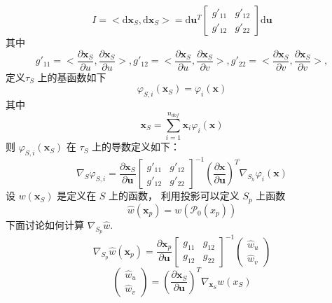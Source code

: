 \documentclass{article}
\begin{document}
\begin{equation*}
I = <\mathrm d \mathbf x_S, \mathrm d \mathbf x_S> = \mathrm d \mathbf u^T 
\begin{bmatrix}
g'_{11} & g'_{12}\\
g'_{12} & g'_{22}
\end{bmatrix}
\mathrm d \mathbf u
\end{equation*}
其中 
\begin{equation*}
g'_{11} =<\frac{\partial \mathbf x_S}{\partial u}, \frac{\partial \mathbf x_S}{\partial u}>, 
g'_{12} =<\frac{\partial \mathbf x_S}{\partial u}, \frac{\partial \mathbf x_S}{\partial v}>, 
g'_{22} =<\frac{\partial \mathbf x_S}{\partial v}, \frac{\partial \mathbf x_S}{\partial v}>, 
\end{equation*}
定义$\tau_S$ 上的基函数如下
\begin{equation*}
\varphi_{S,i}(\mathbf x_S) =\varphi_{i}(\mathbf x) 
\end{equation*}
其中
\begin{equation*}
\mathbf x_S = \sum_{i=1}^{n_{dof}} \mathbf x_i \varphi_{i}(\mathbf x) 
\end{equation*}
则 $\varphi_{S,i}(\mathbf x_S)$ 在 $\tau_S$ 上的导数定义如下：
\begin{equation*}
\nabla_{S} \varphi_{S,i} = \frac{\partial \mathbf x_S}{\partial \mathbf u}\begin{bmatrix}
g'_{11} & g'_{12}\\
g'_{12} & g'_{22}
\end{bmatrix}^{-1}(\frac{\partial \mathbf x}{\partial \mathbf u})^T\nabla_{S_h}\varphi_{i}(\mathbf x) 
\end{equation*}
设 $w(\mathbf x_S)$ 是定义在 $S$ 上的函数， 利用投影可以定义 $S_p$ 上函数 
\begin{equation*}
\hat w(\mathbf x_p) = w(\mathcal P_0(x_p))
\end{equation*}
下面讨论如何计算 $\nabla_{S_p}\hat w$. 
\begin{equation*}
\nabla_{S_p} \hat w(\mathbf x_p) = \frac{\partial \mathbf x_p}{\partial \mathbf u}\begin{bmatrix}
g_{11} & g_{12}\\
g_{12} & g_{22}
\end{bmatrix}^{-1}
\begin{pmatrix}
\hat w_u \\ \hat w_v
\end{pmatrix}
\end{equation*}
\begin{equation*}
\begin{pmatrix}
\hat w_u \\ \hat w_v
\end{pmatrix}
= (\frac{\partial \mathbf x_S}{\partial \mathbf u})^T \nabla_{\mathbf x_S} w(x_S)
\end{equation*}
\newpage
\end{document}
